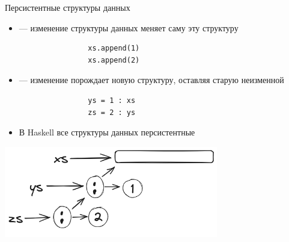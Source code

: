     \begin{frame}[fragile]{Персистентные структуры данных}
        \begin{itemize}
            \item[\defi]  --- изменение структуры данных меняет саму эту структуру
            \begin{verbatim}
                xs.append(1)
                xs.append(2)
            \end{verbatim}
            \item[\defi]  --- изменение порождает новую структуру, оставляя старую неизменной
            \begin{verbatim}
                ys = 1 : xs
                zs = 2 : ys
            \end{verbatim}
            \item[\NB] В Haskell все структуры данных персистентные
        \end{itemize}
        \begin{center}
            \includegraphics[width=0.7\textwidth]{figs/persistent-list}
        \end{center}
    \end{frame}



